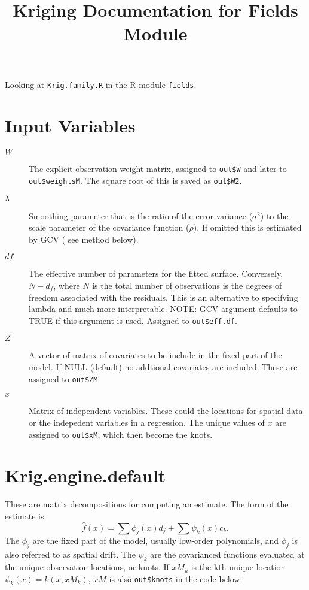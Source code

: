 \documentclass{article}
\title{Kriging Documentation for Fields Module}
\begin{document}
\maketitle
Looking at \texttt{Krig.family.R} in the R module \texttt{fields}.

\section{Input Variables}
\begin{description}
\item[$W$] The explicit observation weight matrix, assigned to \texttt{out\$W} and later to \texttt{out\$weightsM}. The square root of this is saved as \texttt{out\$W2}.
\item[$\lambda$] Smoothing parameter that is the ratio of the error variance ($\sigma^2$) to the scale parameter of the covariance function ($\rho$). If omitted this is estimated by GCV ( see method below).
\item[$df$] The effective number of parameters for the fitted surface. Conversely, $N- d_f$, where $N$ is the total number of observations is the degrees of freedom associated with the residuals. This is an alternative to specifying lambda and much more interpretable. NOTE: GCV argument defaults to TRUE if this argument is used. Assigned to \texttt{out\$eff.df}.
\item[$Z$] A vector of matrix of covariates to be include in the fixed part of the model. If NULL (default) no addtional covariates are included. These are assigned to \texttt{out\$ZM}.
\item[$x$] Matrix of independent variables. These could the locations for spatial data or the indepedent variables in a regression. The unique values of $x$ are assigned to \texttt{out\$xM}, which then become the knots.

\end{description}

\section{Krig.engine.default}
These are matrix decompositions for computing an estimate. The form of the estimate is
\begin{equation}
  \hat{f}(x) = \sum \phi_j(x) d_j + \sum \psi_k(x) c_k.
\end{equation}
The $\phi_j$ are the fixed part of the model, usually low-order polynomials, and
$\phi_j$ is also referred to as spatial drift. The $\psi_k$ are the covarianced functions evaluated at
the unique observation locations, or knots. If $xM_k$ is the kth unique location
$\psi_k(x)=k(x, xM_k)$, $xM$ is also \texttt{out\$knots} in the code below.
\end{document}
